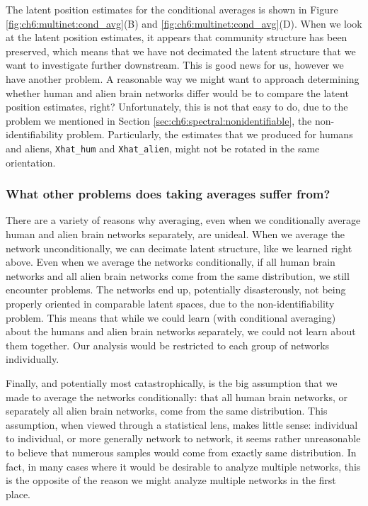 The latent position estimates for the conditional averages is shown in Figure \ref{fig:ch6:multinet:cond_avg}(B) and \ref{fig:ch6:multinet:cond_avg}(D). When we look at the latent position estimates, it appears that community structure has been preserved, which means that we have not decimated the latent structure that we want to investigate further downstream. This is good news for us, however we have another problem. A reasonable way we might want to approach determining whether human and alien brain networks differ would be to compare the latent position estimates, right? Unfortunately, this is not that easy to do, due to the problem we mentioned in Section \ref{sec:ch6:spectral:nonidentifiable}, the non-identifiability problem. Particularly, the estimates that we produced for humans and aliens, \texttt{Xhat\_hum} and \texttt{Xhat\_alien}, might not be rotated in the same orientation. 

\subsubsection{What other problems does taking averages suffer from?}

There are a variety of reasons why averaging, even when we conditionally average human and alien brain networks separately, are unideal. When we average the network unconditionally, we can decimate latent structure, like we learned right above. Even when we average the networks conditionally, if all human brain networks and all alien brain networks come from the same distribution, we still encounter problems. The networks end up, potentially disasterously, not being properly oriented in comparable latent spaces, due to the non-identifiability problem. This means that while we could learn (with conditional averaging) about the humans and alien brain networks separately, we could not learn about them together. Our analysis would be restricted to each group of networks individually.

Finally, and potentially most catastrophically, is the big assumption that we made to average the networks conditionally: that all human brain networks, or separately all alien brain networks, come from the same distribution. This assumption, when viewed through a statistical lens, makes little sense: individual to individual, or more generally network to network, it seems rather unreasonable to believe that numerous samples would come from exactly same distribution. In fact, in many cases where it would be desirable to analyze multiple networks, this is the {opposite} of the reason we might analyze multiple networks in the first place. 

